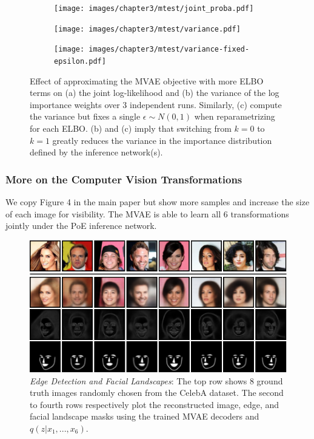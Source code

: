 \begin{figure}[h!]
\centering
    \begin{subfigure}[b]{.32\linewidth}
        \centering
        \texttt{[image: images/chapter3/mtest/joint\_proba.pdf]}
        \caption{}
        \label{fig:mtest:joint}
    \end{subfigure}
    \begin{subfigure}[b]{.32\linewidth}
        \centering
        \texttt{[image: images/chapter3/mtest/variance.pdf]}
        \caption{}
        \label{fig:mtest:var}
    \end{subfigure}
    \begin{subfigure}[b]{.32\linewidth}
        \centering
        \texttt{[image: images/chapter3/mtest/variance-fixed-epsilon.pdf]}
        \caption{}
        \label{fig:mtest:var:epsilon}
    \end{subfigure}
    \caption{Effect of approximating the MVAE objective with more ELBO terms on (a) the joint log-likelihood and (b) the variance of the log importance weights over 3 independent runs. Similarly, (c) compute the variance but fixes a single $\epsilon \sim N(0, 1)$ when reparametrizing for each ELBO. (b) and (c) imply that switching from $k=0$ to $k=1$ greatly reduces the variance in the importance distribution defined by the inference network(s).}
    \label{fig:mtest}
\end{figure}

\subsubsection{More on the Computer Vision Transformations}

We copy Figure 4 in the main paper but show more samples and increase the size of each image for visibility. The MVAE is able to learn all 6 transformations jointly under the PoE inference network.

\begin{figure}[h!]
    \centering
    \includegraphics[width=\linewidth]{images/chapter3/vision/recon_edge_face}
    \caption{\textit{Edge Detection and Facial Landscapes}: The top row shows 8 ground truth images randomly chosen from the CelebA dataset. The second to fourth rows respectively plot the reconstructed image, edge, and facial landscape masks using the trained MVAE decoders and  $q(z|x_{1}, ..., x_{6})$.}
    \label{fig:vision_recon}
\end{figure}

